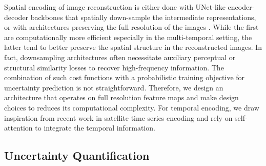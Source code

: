 \documentclass[10pt,twocolumn,letterpaper]{article}
\begin{document}
Spatial encoding of image reconstruction is either done with UNet-like encoder-decoder backbones \cite{ronneberger2015u, isola2017image, zhu2017unpaired} that spatially down-sample the intermediate representations\cite{Enomoto_Sakurada_Wang_Fukui_Matsuoka_Nakamura_Kawaguchi_2017,grohnfeldt2018conditional, ebel2020multisensor}, or with architectures preserving the full resolution of the images \cite{lanaras2018super, meraner2020cloud}. While the first are computationally more efficient especially in the multi-temporal setting, the latter tend to better preserve the spatial structure in the reconstructed images. In fact, downsampling architectures often necessitate auxiliary perceptual \cite{johnson2016perceptual, ebel2020multisensor, hwang2020sar, ebel2021internal} or structural similarity losses \cite{Wang_Bovik_Sheikh_Simoncelli_2004, thin_thick_cr} to recover high-frequency information. The combination of such cost functions with a probabilistic training objective for uncertainty prediction is not straightforward. Therefore, we design an architecture that operates on full resolution feature maps and make design choices to reduces its computational complexity.
For temporal encoding, we draw inspiration from recent work in satellite time series encoding \cite{garnot2020lightweight, garnot2021panoptic, russwurm2020self} and rely on self-attention to integrate the temporal information.

\subsection{Uncertainty Quantification}
\label{sec:related:uncertainty}
\end{document}

